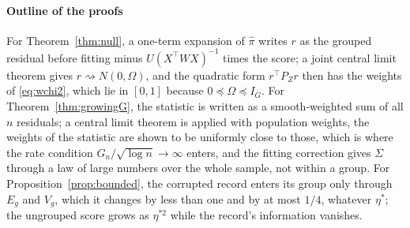\paragraph{Outline of the proofs} For Theorem~\ref{thm:null}, a one-term expansion of $\hat\pi$ writes
$r$ as the grouped residual before fitting minus $U(X^\top WX)^{-1}$ times the score; a joint central
limit theorem gives $r\rightsquigarrow N(0,\Omega)$, and the quadratic form $r^\top P_Zr$ then has the
weights of \eqref{eq:wchi2}, which lie in $[0,1]$ because $0\preceq\Omega\preceq I_G$. For
Theorem~\ref{thm:growingG}, the statistic is written as a smooth-weighted sum of all $n$ residuals; a
central limit theorem is applied with population weights, the weights of the statistic are shown to be
uniformly close to those, which is where the rate condition $G_n/\sqrt{\log n}\to\infty$ enters, and
the fitting correction gives $\Sigma$ through a law of large numbers over the whole sample, not within a
group. For Proposition~\ref{prop:bounded}, the corrupted record enters its group only through $E_g$ and
$V_g$, which it changes by less than one and by at most $1/4$, whatever $\eta^{*}$; the ungrouped score
grows as $\eta^{*2}$ while the record's information vanishes.
